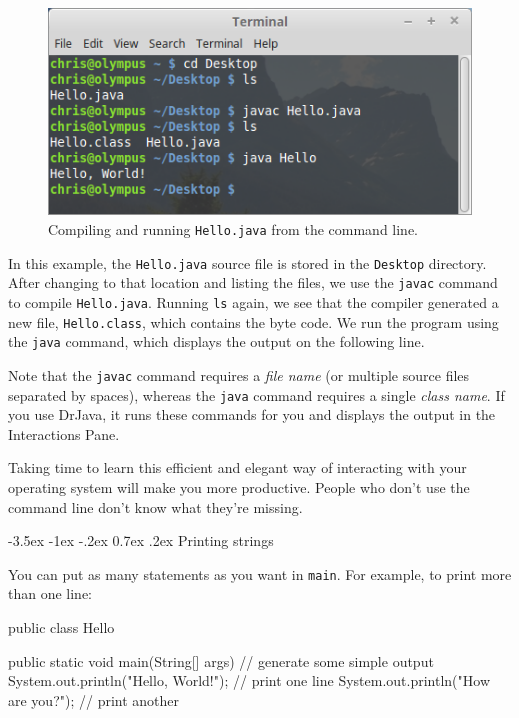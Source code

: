 \documentclass[12pt]{book}
\makeatletter
\theoremstyle{exercise}
\newcommand{\java}[1]{\verb"#1"}
\renewcommand{\section}{\@startsection{section}{1}{\z@}%
    {-3.5ex \@plus -1ex \@minus -.2ex}%
    {0.7ex \@plus.2ex}%
    {\normalfont\Large\bfseries}}
\newcommand{\java}[1]{\lstinline{#1}} %
\makeatother
\begin{document}
\begin{figure}[!h]
\begin{center}
\includegraphics[width=4.5in]{figs/terminal.png}
\caption{Compiling and running {\tt Hello.java} from the command line.}
\end{center}
\end{figure}

In this example, the {\tt Hello.java} source file is stored in the {\tt Desktop} directory.
After changing to that location and listing the files, we use the {\tt javac} command to compile {\tt Hello.java}.
Running {\tt ls} again, we see that the compiler generated a new file, {\tt Hello.class}, which contains the byte code.
We run the program using the {\tt java} command, which displays the output on the following line.

Note that the {\tt javac} command requires a {\em file name} (or multiple source files separated by spaces), whereas the {\tt java} command requires a single {\em class name}.
If you use DrJava, it runs these commands for you and displays the output in the Interactions Pane.

Taking time to learn this efficient and elegant way of interacting with your operating system will make you more productive.
People who don't use the command line don't know what they're missing.



\section{Printing strings}

You can put as many statements as you want in \java{main}.
For example, to print more than one line:

\begin{code}
public class Hello {

    public static void main(String[] args) {
        // generate some simple output
        System.out.println("Hello, World!");  // print one line
        System.out.println("How are you?");   // print another
    }

}
\end{code}
\end{document}
